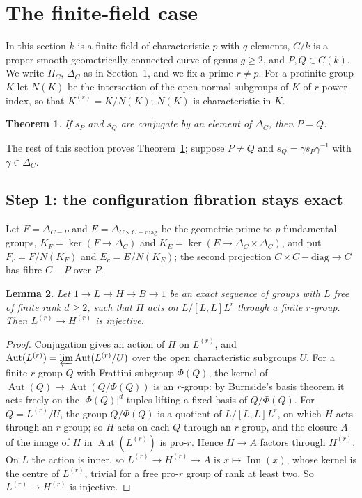 \documentclass[11pt]{amsart}
\newtheorem{thm}{Theorem}[section]
\newtheorem{lemma}[thm]{Lemma}
\theoremstyle{remark}
\DeclareMathOperator{\Inn}{Inn}
\DeclareMathOperator{\Aut}{Aut}
\begin{document}
\section{The finite-field case}\label{sec:finite}

In this section $k$ is a finite field of characteristic $p$ with $q$ elements, $C/k$ is a proper smooth geometrically connected curve of genus $g\ge2$, and $P,Q\in C(k)$. We write $\Pi_C$, $\Delta_C$ as in Section~1, and we fix a prime $r\ne p$. For a profinite group $K$ let $N(K)$ be the intersection of the open normal subgroups of $K$ of $r$-power index, so that $K^{(r)}=K/N(K)$; $N(K)$ is characteristic in $K$.

\begin{thm}\label{thm:finite}
If $s_P$ and $s_Q$ are conjugate by an element of $\Delta_C$, then $P=Q$.
\end{thm}

The rest of this section proves Theorem~\ref{thm:finite}; suppose $P\ne Q$ and $s_Q=\gamma s_P\gamma^{-1}$ with $\gamma\in\Delta_C$.

\subsection{Step 1: the configuration fibration stays exact}
Let $F=\Delta_{C-P}$ and $E=\Delta_{C\times C-\mathrm{diag}}$ be the geometric prime-to-$p$ fundamental groups, $K_F=\ker(F\to\Delta_C)$ and $K_E=\ker(E\to\Delta_C\times\Delta_C)$, and put $F_c=F/N(K_F)$ and $E_c=E/N(K_E)$; the second projection $C\times C-\mathrm{diag}\to C$ has fibre $C-P$ over $P$.

\begin{lemma}\label{lem:free}
Let $1\to L\to H\to B\to1$ be an exact sequence of groups with $L$ free of finite rank $d\ge2$, such that $H$ acts on $L/[L,L]L^r$ through a finite $r$-group. Then $L^{(r)}\to H^{(r)}$ is injective.
\end{lemma}

\begin{proof}
Conjugation gives an action of $H$ on $L^{(r)}$, and $\Aut(L^{(r)})=\varprojlim\Aut(L^{(r)}/U)$ over the open characteristic subgroups $U$. For a finite $r$-group $Q$ with Frattini subgroup $\Phi(Q)$, the kernel of $\Aut(Q)\to\Aut(Q/\Phi(Q))$ is an $r$-group: by Burnside's basis theorem it acts freely on the $|\Phi(Q)|^d$ tuples lifting a fixed basis of $Q/\Phi(Q)$. For $Q=L^{(r)}/U$, the group $Q/\Phi(Q)$ is a quotient of $L/[L,L]L^r$, on which $H$ acts through an $r$-group; so $H$ acts on each $Q$ through an $r$-group, and the closure $A$ of the image of $H$ in $\Aut(L^{(r)})$ is pro-$r$. Hence $H\to A$ factors through $H^{(r)}$. On $L$ the action is inner, so $L^{(r)}\to H^{(r)}\to A$ is $x\mapsto\Inn(x)$, whose kernel is the centre of $L^{(r)}$, trivial for a free pro-$r$ group of rank at least two. So $L^{(r)}\to H^{(r)}$ is injective.
\end{proof}
\end{document}
